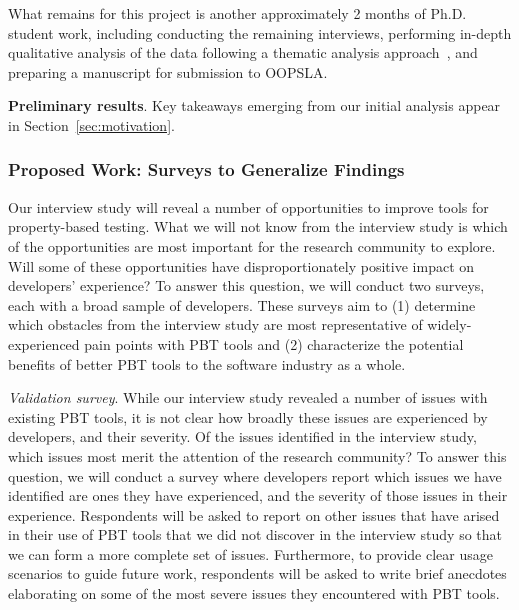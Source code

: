 What remains for this project is another approximately 2 months of Ph.D.
student work, including conducting the remaining interviews, performing
in-depth qualitative analysis of the data following a thematic analysis
approach~\cite[Chapter 5]{blandford2016qualitative}, and preparing a manuscript
for submission to OOPSLA.

\textbf{Preliminary results}. Key takeaways emerging from our initial analysis
appear in Section~\ref{sec:motivation}.

\subsubsection{Proposed Work: Surveys to Generalize Findings}
\label{sec:survey}


Our interview study will reveal a number of opportunities to
improve tools for property-based testing. What we will not
know from the interview study is which of the opportunities
are most important for the research community to explore. Will
some of these opportunities have disproportionately positive
impact on developers' experience? To answer this question,
we will conduct two surveys, each with a broad sample of
developers. These surveys aim to (1) determine which
obstacles from the interview study are most representative
of widely-experienced pain points with PBT tools and
(2) characterize the potential benefits of better PBT tools
to the software industry as a whole.

\emph{Validation survey}. While our interview study revealed
a number of issues with existing PBT tools, it is not clear
how broadly these issues are experienced by developers, and
their severity. Of the issues identified in the interview
study, which issues most merit the attention of the research
community? To answer this question, we will conduct a survey
where developers report which issues we have identified are
ones they have experienced, and the severity of those issues
in their experience. Respondents will be asked to report on
other issues that have arised in their use of PBT tools that
we did not discover in the interview study so that we can
form a more complete set of issues. Furthermore, to provide
clear usage scenarios to guide future work, respondents will
be asked to write brief anecdotes elaborating on some of the
most severe issues they encountered with PBT tools.

